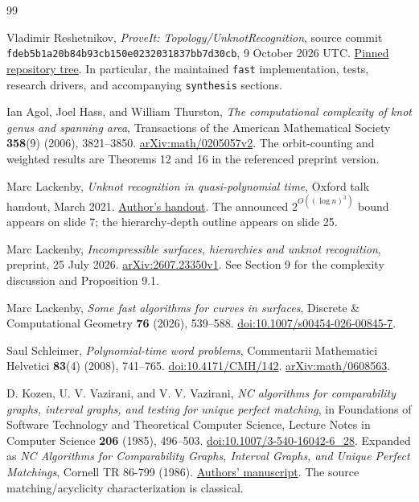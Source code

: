 \begin{thebibliography}{99}
\raggedright
{}

Vladimir Reshetnikov, \emph{ProveIt: Topology/UnknotRecognition}, source
commit \texttt{fdeb5b1a20b84b93cb150e0232031837bb7d30cb},
9 October 2026 UTC.
\href{https://github.com/VladimirReshetnikov/ProveIt/tree/fdeb5b1a20b84b93cb150e0232031837bb7d30cb/Topology/UnknotRecognition}{Pinned repository tree}.
In particular, the maintained \texttt{fast} implementation, tests,
research drivers, and accompanying \texttt{synthesis} sections.

Ian Agol, Joel Hass, and William Thurston,
\emph{The computational complexity of knot genus and spanning area},
Transactions of the American Mathematical Society \textbf{358}(9)
(2006), 3821--3850.
\href{https://arxiv.org/abs/math/0205057v2}{arXiv:math/0205057v2}.
The orbit-counting and weighted results are Theorems 12 and 16 in the
referenced preprint version.

Marc Lackenby, \emph{Unknot recognition in quasi-polynomial time},
Oxford talk handout, March 2021.
\href{https://people.maths.ox.ac.uk/lackenby/quasipolynomial-talk-oxford-compressed.pdf}{Author's handout}.
The announced $2^{O((\log n)^3)}$ bound appears on slide 7;
the hierarchy-depth outline appears on slide 25.

Marc Lackenby, \emph{Incompressible surfaces, hierarchies and unknot
recognition}, preprint, 25 July 2026.
\href{https://arxiv.org/abs/2607.23350v1}{arXiv:2607.23350v1}.
See Section 9 for the complexity discussion and Proposition 9.1.

Marc Lackenby, \emph{Some fast algorithms for curves in surfaces},
Discrete \& Computational Geometry \textbf{76} (2026), 539--588.
\href{https://doi.org/10.1007/s00454-026-00845-7}{doi:10.1007/s00454-026-00845-7}.

Saul Schleimer, \emph{Polynomial-time word problems},
Commentarii Mathematici Helvetici \textbf{83}(4) (2008), 741--765.
\href{https://doi.org/10.4171/CMH/142}{doi:10.4171/CMH/142}.
\href{https://arxiv.org/abs/math/0608563}{arXiv:math/0608563}.

D. Kozen, U. V. Vazirani, and V. V. Vazirani,
\emph{NC algorithms for comparability graphs, interval graphs, and
testing for unique perfect matching}, in Foundations of Software Technology and
Theoretical Computer Science, Lecture Notes in Computer Science
\textbf{206} (1985), 496--503.
\href{https://doi.org/10.1007/3-540-16042-6_28}{doi:10.1007/3-540-16042-6\_28}.
Expanded as \emph{NC Algorithms for Comparability Graphs, Interval Graphs,
and Unique Perfect Matchings}, Cornell TR 86-799 (1986).
\href{https://www.cs.cornell.edu/~kozen/Papers/comp.pdf}{Authors' manuscript}.
The source matching/acyclicity characterization is classical.


\end{thebibliography}
